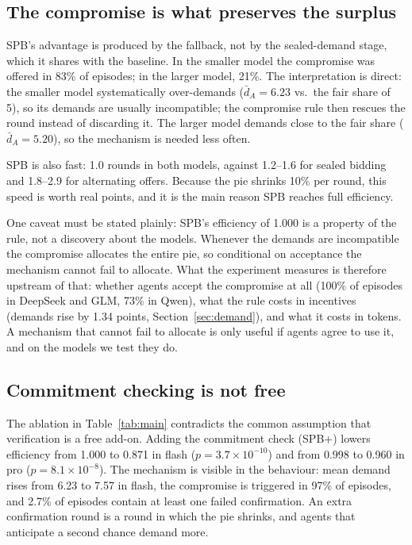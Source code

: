 \documentclass[11pt]{article}
\begin{document}
\subsection{The compromise is what preserves the surplus}

SPB's advantage is produced by the fallback, not by the sealed-demand stage, which it shares with the baseline. In the smaller model the compromise was offered in 83\% of episodes; in the larger model, 21\%. The interpretation is direct: the smaller model systematically over-demands ($\bar d_A=6.23$ vs.\ the fair share of 5), so its demands are usually incompatible; the compromise rule then rescues the round instead of discarding it. The larger model demands close to the fair share ($\bar d_A=5.20$), so the mechanism is needed less often.

SPB is also fast: 1.0 rounds in both models, against 1.2--1.6 for sealed bidding and 1.8--2.9 for alternating offers. Because the pie shrinks 10\% per round, this speed is worth real points, and it is the main reason SPB reaches full efficiency.

One caveat must be stated plainly: SPB's efficiency of 1.000 is a property of the rule, not a discovery about the models. Whenever the demands are incompatible the compromise allocates the entire pie, so conditional on acceptance the mechanism cannot fail to allocate. What the experiment measures is therefore upstream of that: whether agents accept the compromise at all (100\% of episodes in DeepSeek and GLM, 73\% in Qwen), what the rule costs in incentives (demands rise by 1.34 points, Section~\ref{sec:demand}), and what it costs in tokens. A mechanism that cannot fail to allocate is only useful if agents agree to use it, and on the models we test they do.

\subsection{Commitment checking is not free}

The ablation in Table~\ref{tab:main} contradicts the common assumption that verification is a free add-on. Adding the commitment check (SPB+) lowers efficiency from 1.000 to 0.871 in flash ($p=3.7\times10^{-10}$) and from 0.998 to 0.960 in pro ($p=8.1\times10^{-8}$). The mechanism is visible in the behaviour: mean demand rises from 6.23 to 7.57 in flash, the compromise is triggered in 97\% of episodes, and 2.7\% of episodes contain at least one failed confirmation. An extra confirmation round is a round in which the pie shrinks, and agents that anticipate a second chance demand more.
\end{document}
